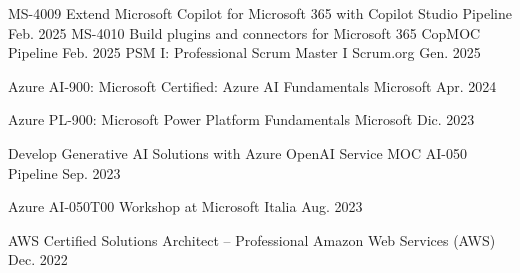 

\begin{cvhonors}

\cvhonor
{MS-4009 Extend Microsoft Copilot for Microsoft 365 with Copilot Studio} %
{Pipeline} %
{} %
{Feb. 2025} %
\cvhonor
{MS-4010 Build plugins and connectors for Microsoft 365 CopMOC} %
{Pipeline} %
{} %
{Feb. 2025} %
  \cvhonor
  {PSM I: Professional Scrum Master I} %
  {Scrum.org} %
  {} %
  {Gen. 2025} %

  \cvhonor
    {Azure AI-900: Microsoft Certified: Azure AI Fundamentals} %
    {Microsoft} %
    {} %
    {Apr. 2024} %

  \cvhonor
    {Azure PL-900: Microsoft Power Platform Fundamentals} %
    {Microsoft} %
    {} %
    {Dic. 2023} %

  \cvhonor
    {Develop Generative AI Solutions with Azure OpenAI Service MOC AI-050} %
    {Pipeline} %
    {} %
    {Sep. 2023} %

  \cvhonor
    {Azure AI-050T00} %
    {Workshop at Microsoft Italia} %
    {} %
    {Aug. 2023} %

  \cvhonor
    {AWS Certified Solutions Architect – Professional} %
    {Amazon Web Services (AWS)} %
    {} %
    {Dec. 2022} %


\end{cvhonors}

